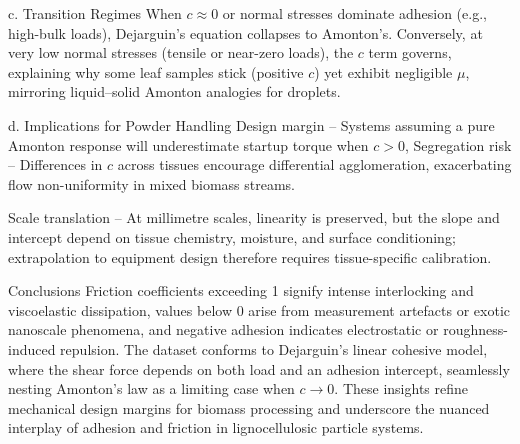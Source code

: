 \documentclass[xcolor=dvipsnames,10pt,hidelinks]{article}
\begin{document}
c. Transition Regimes
When \(c\approx 0\) or normal stresses dominate adhesion (e.g., high-bulk loads), Dejarguin’s equation collapses to Amonton’s. Conversely, at very low normal stresses (tensile or near-zero loads), the \(c\) term governs, explaining why some leaf samples stick (positive \(c\)) yet exhibit negligible \(\mu\), mirroring liquid–solid Amonton analogies for droplets.

d. Implications for Powder Handling
Design margin – Systems assuming a pure Amonton response will underestimate startup torque when \(c > 0\),
Segregation risk – Differences in \(c\) across tissues encourage differential agglomeration, exacerbating flow non-uniformity in mixed biomass streams.

Scale translation – At millimetre scales, linearity is preserved, but the slope and intercept depend on tissue chemistry, moisture, and surface conditioning; extrapolation to equipment design therefore requires tissue-specific calibration.

Conclusions
Friction coefficients exceeding 1 signify intense interlocking and viscoelastic dissipation, values below 0 arise from measurement artefacts or exotic nanoscale phenomena, and negative adhesion indicates electrostatic or roughness-induced repulsion.
The dataset conforms to Dejarguin’s linear cohesive model, where the shear force depends on both load and an adhesion intercept, seamlessly nesting Amonton’s law as a limiting case when \(c \to 0\).
These insights refine mechanical design margins for biomass processing and underscore the nuanced interplay of adhesion and friction in lignocellulosic particle systems.
\end{document}
